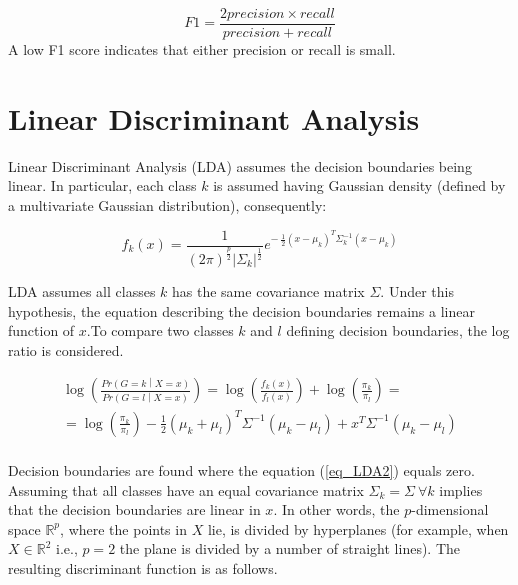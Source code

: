 \begin{equation}
    F1=\frac{2precision\times recall}{precision+recall}
    \label{eq_f1Score}
\end{equation}
A low F1 score indicates that either precision or recall is small.

\section{Linear Discriminant Analysis}
Linear Discriminant Analysis (LDA) assumes the decision boundaries being linear. In particular, each class $k$ is assumed having Gaussian density (defined by a multivariate Gaussian distribution), consequently:

\begin{equation}
    f_k\left(x\right)=\frac{1}{\left(2\pi\right)^\frac{p}{2}\left|\Sigma_k\right|^\frac{1}{2}}e^{-\ \frac{1}{2}\left(x-\mu_k\right)^T\Sigma_k^{-1}(x-\mu_k)}
    \label{eq_LDA1}
\end{equation}

LDA assumes all classes $k$ has the same covariance matrix $\Sigma$. Under this hypothesis, the equation describing the decision boundaries remains a linear function of $x$.To compare two classes $k$ and $l$ defining decision boundaries, the log ratio is considered.

\begin{equation}
    \begin{split}
        \log{\left(\frac{Pr{\left(G=k\middle| X=x\right)}}{Pr{\left(G=l\middle| X=x\right)}}\right)}= \log{\left(\frac{f_k\left(x\right)}{f_l\left(x\right)}\right)}+\log{\left(\frac{\pi_k}{\pi_l}\right)}= \\    
        = \log{\left(\frac{\pi_k}{\pi_l}\right)}-\frac{1}{2}\left(\mu_k+\mu_l\right)^T\Sigma^{-1}\left(\mu_k-\mu_l\right)+x^T\Sigma^{-1}(\mu_k-\mu_l)\\
    \end{split}
    \label{eq_LDA2}
\end{equation}

Decision boundaries are found where the equation (\ref{eq_LDA2}) equals zero. Assuming that all classes have an equal covariance matrix $\Sigma_k=\Sigma\ \forall k$ implies that the decision boundaries are linear in $x$. In other words, the $p$-dimensional space $\mathbb{R}^p$, where the points in $X$ lie, is divided by hyperplanes (for example, when $X\in \mathbb{R}^2$ i.e., $p=2$ the plane is divided by a number of straight lines). The resulting discriminant function is as follows.

